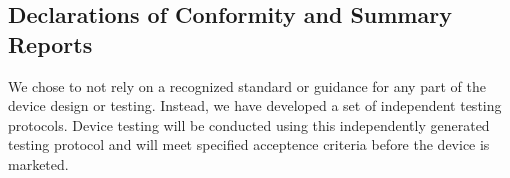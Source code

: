 \newpage
\subsection{Declarations of Conformity and Summary Reports}

We chose to not rely on a recognized standard or guidance for any part
of the device design or testing. Instead, we have developed a set of
independent testing protocols. Device testing will be conducted using
this independently generated testing protocol and will meet specified
acceptence criteria before the device is marketed. 

